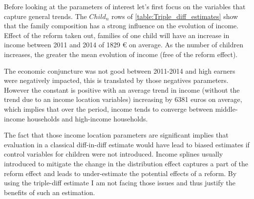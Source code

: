




Before looking at the parameters of interest let's first focus on the variables that capture general trends. The $Child_n$ rows of \autoref{table:Triple_diff_estimates}  show that the family composition has a strong influence on the evolution of income. Effect of the reform taken out, families of one child will have an increase in income between 2011 and 2014 of 1829 \euro{} on average. As the number of children increases, the greater the mean evolution of income (free of the reform effect). 



The economic conjuncture was not good between 2011-2014 and high earners were negatively impacted, this is translated by those negatives parameters. However the constant is positive with an average trend in income (without the trend due to an income location variables) increasing by 6381 euros on average, which implies that over the period, income tends to converge between middle-income households and high-income households.
 
 The fact that those income location parameters are significant implies that evaluation in a classical diff-in-diff estimate would have lead to biased estimates if control variables for children were not introduced. Income splines usually introduced to mitigate the change in the distribution effect captures a part of the reform effect and leads to under-estimate the potential effects of a reform. By using the triple-diff estimate I am not facing those issues and thus justify the benefits of such an estimation.
 
